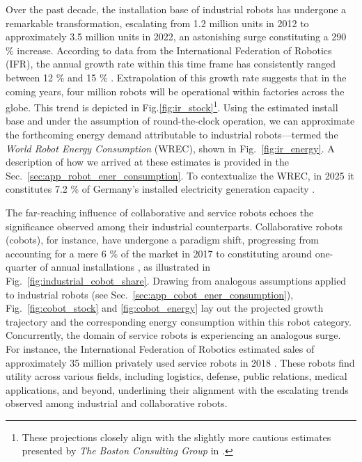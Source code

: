 \documentclass[12pt]{article}
\begin{document}
Over the past decade, the installation base of industrial robots has undergone a remarkable transformation, escalating from 1.2 million units in 2012 to approximately 3.5 million units in 2022, an astonishing surge constituting a 290 \% increase. According to data from the International Federation of Robotics (IFR), the annual growth rate within this time frame has consistently ranged between 12 \% and 15 \% \cite{IFR2019}. Extrapolation of this growth rate suggests that in the coming years, four million robots will be operational within factories across the globe. This trend is depicted in Fig.\ref{fig:ir_stock}\footnote{These projections closely align with the slightly more cautious estimates presented by \textit{The Boston Consulting Group} in \cite{sirkin2015}.}. Using the estimated install base and under the assumption of round-the-clock operation, we can approximate the forthcoming energy demand attributable to industrial robots---termed the \textit{World Robot Energy Consumption} (WREC), shown in Fig.~\ref{fig:ir_energy}. A description of how we arrived at these estimates is provided in the  Sec.~\ref{sec:app_robot_ener_consumption}. To contextualize the WREC, in 2025 it constitutes 7.2 \% of Germany's installed electricity generation capacity \cite{fraunhofer2016}.

The far-reaching influence of collaborative and service robots echoes the significance observed among their industrial counterparts. Collaborative robots (cobots), for instance, have undergone a paradigm shift, progressing from accounting for a mere 6 \% of the market in 2017 to constituting around one-quarter of annual installations \cite{tobe2015}, as illustrated in Fig.~\ref{fig:industrial_cobot_share}. Drawing from analogous assumptions applied to industrial robots (see Sec.~\ref{sec:app_cobot_ener_consumption}), Fig.~\ref{fig:cobot_stock} and \ref{fig:cobot_energy} lay out the projected growth trajectory and the corresponding energy consumption within this robot category. Concurrently, the domain of service robots is experiencing an analogous surge. For instance, the International Federation of Robotics estimated sales of approximately 35 million privately used service robots in 2018 \cite{IFR2015}. These robots find utility across various fields, including logistics, defense, public relations, medical applications, and beyond, underlining their alignment with the escalating trends observed among industrial and collaborative robots.

\end{document}
